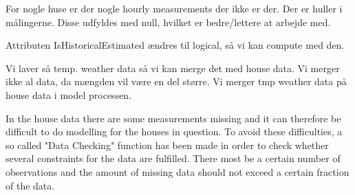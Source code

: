 For nogle huse er der nogle hourly measurements der ikke er der. Der er huller i målingerne. Disse udfyldes med null, hvilket er bedre/lettere at arbejde med. 


Attributen IsHistoricalEstimated ændres til logical, så vi kan compute med den. 

Vi laver så temp. weather data så vi kan merge det med house data. 
Vi merger ikke al data, da mængden vil være en del større. Vi merger tmp weather data på house data i model processen. 

In the house data there are some measurements missing and it can therefore be difficult to do modelling for the houses in question. To avoid these difficulties, a so called "Data Checking" function has been made in order to check whether several constraints for the data are fulfilled. There most be a certain number of observations and the amount of missing data should not exceed a certain fraction of the data. 